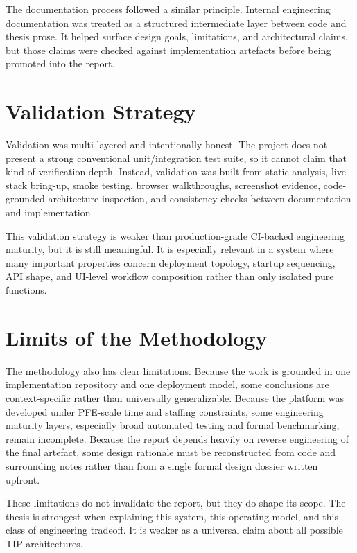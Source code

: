 The documentation process followed a similar principle. Internal engineering documentation was treated as a structured intermediate layer between code and thesis prose. It helped surface design goals, limitations, and architectural claims, but those claims were checked against implementation artefacts before being promoted into the report.

\section{Validation Strategy}
Validation was multi-layered and intentionally honest. The project does not present a strong conventional unit/integration test suite, so it cannot claim that kind of verification depth. Instead, validation was built from static analysis, live-stack bring-up, smoke testing, browser walkthroughs, screenshot evidence, code-grounded architecture inspection, and consistency checks between documentation and implementation.

This validation strategy is weaker than production-grade CI-backed engineering maturity, but it is still meaningful. It is especially relevant in a system where many important properties concern deployment topology, startup sequencing, API shape, and UI-level workflow composition rather than only isolated pure functions.

\section{Limits of the Methodology}
The methodology also has clear limitations. Because the work is grounded in one implementation repository and one deployment model, some conclusions are context-specific rather than universally generalizable. Because the platform was developed under PFE-scale time and staffing constraints, some engineering maturity layers, especially broad automated testing and formal benchmarking, remain incomplete. Because the report depends heavily on reverse engineering of the final artefact, some design rationale must be reconstructed from code and surrounding notes rather than from a single formal design dossier written upfront.

These limitations do not invalidate the report, but they do shape its scope. The thesis is strongest when explaining this system, this operating model, and this class of engineering tradeoff. It is weaker as a universal claim about all possible TIP architectures.

